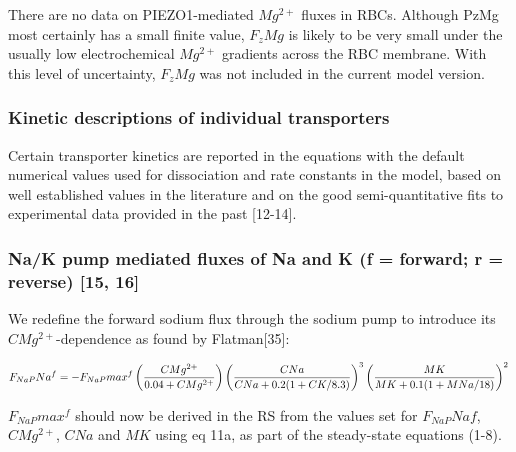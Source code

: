 \documentclass[a4paper]{article}
\newcommand{\med}[1]{M#1}
\newcommand{\cell}[1]{C#1}
\newcommand{\MNa}{\med{Na}}
\newcommand{\MK}{\med{K}}
\newcommand{\CNa}{\cell{Na}}
\newcommand{\CK}{\cell{K}}
\newcommand{\CMg}{\cell{Mg}}
\newcommand{\F}[2]{F_{#1}#2}
\begin{document}
There are no data on PIEZO1-mediated $Mg^{2+}$ fluxes in RBCs.  Although PzMg most certainly has a small finite value, $\F{z}{Mg}$ is likely to be very small under the usually low electrochemical $Mg^{2+}$ gradients across the RBC membrane.  With this level of uncertainty, $\F{z}{Mg}$ was not included in the current model version.  

\subsubsection{Kinetic descriptions of individual transporters}
Certain transporter kinetics are reported in the equations with the default numerical values used for dissociation and rate constants in the model, based on well established values in the literature and on the good semi-quantitative fits to experimental data provided in the past [12-14].

\setcounter{equation}{0}
\renewcommand{\theequation}{11.\alph{equation}}


\subsubsection{Na/K pump mediated fluxes of Na and K (f = forward; r = reverse) [15, 16]}

We redefine the forward sodium flux through the sodium pump to introduce its $CMg^{2+}$-dependence as found by Flatman[35]:

\begin{equation}
  \F{NaP}{Na}^f  = -\F{NaP}{max}^f \left(\frac{\CMg^{2+}}{0.04 + CMg^{2+}}\right)\left(\frac{\CNa}{\CNa + 0.2(1 + \CK/8.3)}\right)^3 \left(\frac{\MK}{\MK + 0.1(1 + \MNa/18)}\right)^2 \\
\end{equation}

$\F{NaP}{max}^f$ should now be derived in the RS from the values set for $\F{NaP}{Naf}$, $CMg^{2+}$, $CNa$ and $MK$ using eq 11a, as part of the steady-state equations (1-8).
\end{document}
